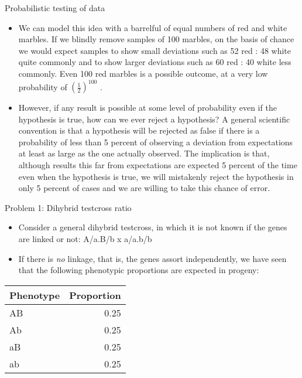 \documentclass[11pt,ignorenonframetext,aspectratio=169]{beamer}
\providecommand{\tightlist}{%
  \setlength{\itemsep}{0pt}\setlength{\parskip}{0pt}}
\begin{document}
\begin{frame}{Probabilistic testing of data}
\protect\hypertarget{probabilistic-testing-of-data}{}
\begin{itemize}
\tightlist
\item
  We can model this idea with a barrelful of equal numbers of red and
  white marbles. If we blindly remove samples of 100 marbles, on the
  basis of chance we would expect samples to show small deviations such
  as 52 red : 48 white quite commonly and to show larger deviations such
  as 60 red : 40 white less commonly. Even 100 red marbles is a possible
  outcome, at a very low probability of
  \(\left(\frac{1}{2}\right)^{100}\) .
\item
  However, if any result is possible at some level of probability even
  if the hypothesis is true, how can we ever reject a hypothesis? A
  general scientific convention is that a hypothesis will be rejected as
  false if there is a probability of less than 5 percent of observing a
  deviation from expectations at least as large as the one actually
  observed. The implication is that, although results this far from
  expectations are expected 5 percent of the time even when the
  hypothesis is true, we will mistakenly reject the hypothesis in only 5
  percent of cases and we are willing to take this chance of error.
\end{itemize}
\end{frame}

\begin{frame}{Problem 1: Dihybrid testcross ratio}
\protect\hypertarget{problem-1-dihybrid-testcross-ratio}{}
\small

\begin{itemize}
\tightlist
\item
  Consider a general dihybrid testcross, in which it is not known if the
  genes are linked or not: A/a.B/b x a/a.b/b
\item
  If there is \emph{no} linkage, that is, the genes assort
  independently, we have seen that the following phenotypic proportions
  are expected in progeny:
\end{itemize}

\begin{table}[H]
\centering\begingroup\fontsize{6}{8}\selectfont

\begin{tabular}{lr}
\toprule
Phenotype & Proportion\\
\midrule
AB & 0.25\\
Ab & 0.25\\
aB & 0.25\\
ab & 0.25\\
\bottomrule
\end{tabular}
\endgroup{}
\end{table}
\end{frame}
\end{document}
